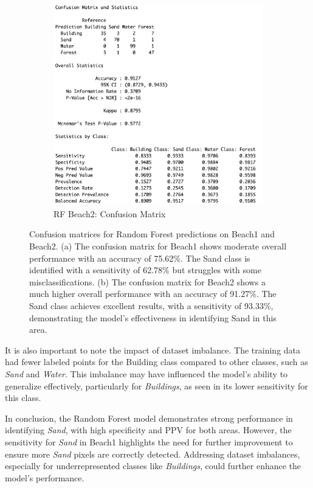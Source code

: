 \documentclass[a4paper,12pt]{article}
\begin{document}
\begin{figure}[H]
\begin{subfigure}[b]{0.48\linewidth}
        \includegraphics[width=\linewidth]{Random_Forest_Model/Random ForestBeach2 Confusionmatrix.png}
        \caption{RF Beach2: Confusion Matrix}
        \label{fig:rf_tconf2}
    \end{subfigure}
    \caption[Confusion matrices for Random Forest predictions on Beach1 and Beach2]{Confusion matrices for Random Forest predictions on Beach1 and Beach2.
(a) The confusion matrix for Beach1 shows moderate overall performance with an accuracy of 75.62\%. The Sand class is identified with a sensitivity of 62.78\% but struggles with some misclassifications.
(b) The confusion matrix for Beach2 shows a much higher overall performance with an accuracy of 91.27\%. The Sand class achieves excellent results, with a sensitivity of 93.33\%, demonstrating the model's effectiveness in identifying Sand in this area.}
    \label{fig:rf_comparison}
\end{figure}

It is also important to note the impact of dataset imbalance. The training data had fewer labeled points for the Building class compared to other classes, such as \textit{Sand} and \textit{Water}. This imbalance may have influenced the model's ability to generalize effectively, particularly for \textit{Buildings}, as seen in its lower sensitivity for this class.

In conclusion, the Random Forest model demonstrates strong performance in identifying \textit{Sand}, with high specificity and PPV for both areas. However, the sensitivity for \textit{Sand} in Beach1 highlights the need for further improvement to ensure more \textit{Sand} pixels are correctly detected. Addressing dataset imbalances, especially for underrepresented classes like \textit{Buildings}, could further enhance the model's performance.
\end{document}

